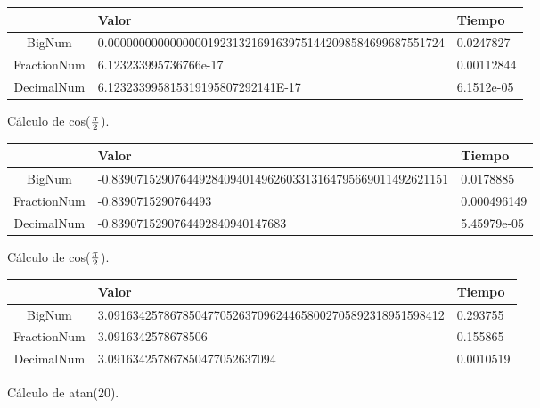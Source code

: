 \documentclass[a4paper,10pt,twocolumn]{article}
\begin{document}
	\begin{figure}[h!]%
		\begin{center}
			\begin{tabular}{|c|l|l|} \hline
			 			& Valor 	    & Tiempo 	\\ \hline
			BigNum       &  0.000000000000000019231321691639751442098584699687551724  &  0.0247827   \\ \hline
FractionNum  &  6.123233995736766e-17                                     &  0.00112844  \\ \hline
DecimalNum   &  6.123233995815319195807292141E-17                         &  6.1512e-05  \\ \hline

\end{tabular}
		\caption{Cálculo de cos($\pi\over 2$). \label{fig:ex}}
		\end{center}
	\end{figure}
	
	\begin{figure}[h!]%
		\begin{center}
			\begin{tabular}{|c|l|l|} \hline
			 			& Valor 	    & Tiempo 	\\ \hline
			BigNum       &  -0.839071529076449284094014962603313164795669011492621151  &  0.0178885    \\ \hline
FractionNum  &  -0.8390715290764493                                        &  0.000496149  \\ \hline
DecimalNum   &  -0.8390715290764492840940147683                            &  5.45979e-05  \\ \hline

\end{tabular}
		\caption{Cálculo de cos($\pi\over 2$). \label{fig:ex}}
		\end{center}
	\end{figure}
	
	\begin{figure}[h!]%
		\begin{center}
			\begin{tabular}{|c|l|l|} \hline
			 			& Valor 	    & Tiempo 	\\ \hline
			BigNum       &  3.091634257867850477052637096244658002705892318951598412  &  0.293755   \\ \hline
FractionNum  &  3.0916342578678506                                        &  0.155865   \\ \hline
DecimalNum   &  3.091634257867850477052637094                             &  0.0010519  \\ \hline

\end{tabular}
		\caption{Cálculo de atan(20). \label{fig:ex}}
		\end{center}
	\end{figure}	
	
\end{document}
